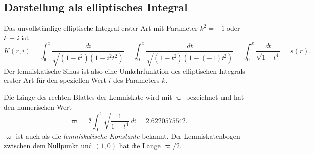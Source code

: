 %
%
\subsection{Darstellung als elliptisches Integral}
Das unvollständige elliptische Integral erster Art mit Parameter
$k^2=-1$ oder $k=i$ ist
\[
K(r,i)
=
\int_0^x \frac{dt}{\sqrt{(1-t^2)(1-i^2 t^2)}}
=
\int_0^x \frac{dt}{\sqrt{(1-t^2)(1-(-1)t^2)}}
=
\int_0^x \frac{dt}{\sqrt{1-t^4}}
=
s(r).
\]
Der lemniskatische Sinus ist also eine Umkehrfunktion des
elliptischen Integrals erster Art für den speziellen Wert $i$ des
Parameters $k$.

Die Länge des rechten Blattes der Lemniskate wird mit $\varpi$ bezeichnet
und hat den numerischen Wert
\[
\varpi
=
2\int_0^1\sqrt{\frac{1}{1-t^4}}\,dt
=
2.6220575542.
\]
$\varpi$ ist auch als die {\em lemniskatische Konstante} bekannt.
%
Der Lemniskatenbogen zwischen dem Nullpunkt und $(1,0)$ hat die Länge
$\varpi/2$.

%
%
